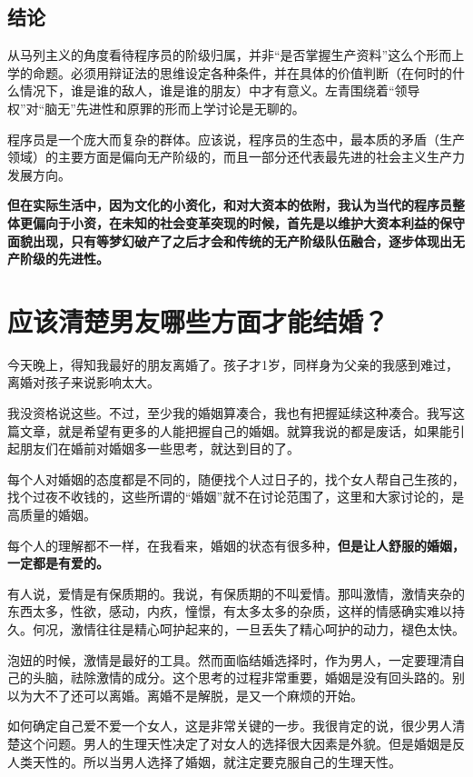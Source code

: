 \documentclass[punct=kaiming, zihao=5, openany, fontset=sikou]{ctexbook}
\begin{document}
\section{结论}
从马列主义的角度看待程序员的阶级归属，并非“是否掌握生产资料”这么个形而上学的命题。必须用辩证法的思维设定各种条件，并在具体的价值判断（在何时的什么情况下，谁是谁的敌人，谁是谁的朋友）中才有意义。左青围绕着“领导权”对“脑无”先进性和原罪的形而上学讨论是无聊的。

程序员是一个庞大而复杂的群体。应该说，程序员的生态中，最本质的矛盾（生产领域）的主要方面是偏向无产阶级的，而且一部分还代表最先进的社会主义生产力发展方向。

{\bfseries 但在实际生活中，因为文化的小资化，和对大资本的依附，我认为当代的程序员整体更偏向于小资，在未知的社会变革突现的时候，首先是以维护大资本利益的保守面貌出现，只有等梦幻破产了之后才会和传统的无产阶级队伍融合，逐步体现出无产阶级的先进性。}

\chapter{应该清楚男友哪些方面才能结婚？}
今天晚上，得知我最好的朋友离婚了。孩子才1岁，同样身为父亲的我感到难过，离婚对孩子来说影响太大。

我没资格说这些。不过，至少我的婚姻算凑合，我也有把握延续这种凑合。我写这篇文章，就是希望有更多的人能把握自己的婚姻。就算我说的都是废话，如果能引起朋友们在婚前对婚姻多一些思考，就达到目的了。

每个人对婚姻的态度都是不同的，随便找个人过日子的，找个女人帮自己生孩的，找个过夜不收钱的，这些所谓的“婚姻”就不在讨论范围了，这里和大家讨论的，是高质量的婚姻。

每个人的理解都不一样，在我看来，婚姻的状态有很多种，\textbf{但是让人舒服的婚姻，一定都是有爱的。}

有人说，爱情是有保质期的。我说，有保质期的不叫爱情。那叫激情，激情夹杂的东西太多，性欲，感动，内疚，憧憬，有太多太多的杂质，这样的情感确实难以持久。何况，激情往往是精心呵护起来的，一旦丢失了精心呵护的动力，褪色太快。

泡妞的时候，激情是最好的工具。然而面临结婚选择时，作为男人，一定要理清自己的头脑，祛除激情的成分。这个思考的过程非常重要，婚姻是没有回头路的。别以为大不了还可以离婚。离婚不是解脱，是又一个麻烦的开始。

如何确定自己爱不爱一个女人，这是非常关键的一步。我很肯定的说，很少男人清楚这个问题。男人的生理天性决定了对女人的选择很大因素是外貌。但是婚姻是反人类天性的。所以当男人选择了婚姻，就注定要克服自己的生理天性。
\end{document}
